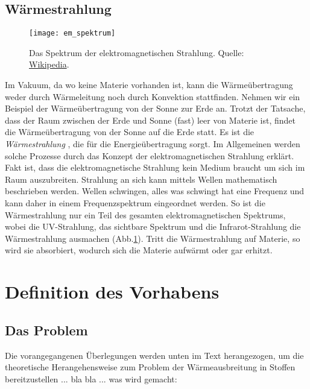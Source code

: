 \subsection{Wärmestrahlung}

\begin{figure}[!h]
	\centering
	\texttt{[image: em\_spektrum]}
	\caption{Das Spektrum der elektromagnetischen Strahlung. Quelle: \href{https://de.wikipedia.org/wiki/Elektromagnetisches_Spektrum}{Wikipedia}.}
	\label{fig:1.1.3_1}
\end{figure}

Im Vakuum, da wo keine Materie vorhanden ist, kann die Wärmeübertragung weder durch Wärmeleitung noch durch Konvektion stattfinden. Nehmen wir ein Beispiel der Wärmeübertragung von der Sonne zur Erde an. Trotzt der Tatsache, dass der Raum zwischen der Erde und Sonne (fast) leer von Materie ist, findet die Wärmeübertragung von der Sonne auf die Erde statt. Es ist die \textit{Wärmestrahlung }, die für die Energieübertragung sorgt. Im Allgemeinen werden solche Prozesse durch das Konzept der elektromagnetischen Strahlung erklärt. Fakt ist, dass die elektromagnetische Strahlung kein Medium braucht um sich im Raum auszubreiten. Strahlung an sich kann mittels Wellen mathematisch beschrieben werden. Wellen schwingen, alles was schwingt hat eine Frequenz und kann daher in einem Frequenzspektrum eingeordnet werden. So ist die Wärmestrahlung nur ein Teil des gesamten elektromagnetischen Spektrums, wobei die UV-Strahlung, das sichtbare Spektrum und die Infrarot-Strahlung die Wärmestrahlung ausmachen (Abb.\ref{fig:1.1.3_1}). Tritt die Wärmestrahlung auf Materie, so wird sie absorbiert, wodurch sich die Materie aufwärmt oder gar erhitzt.

\section{Definition des Vorhabens}

\subsection{Das Problem}

Die vorangegangenen Überlegungen werden unten im Text herangezogen, um die theoretische Herangehensweise zum Problem der Wärmeausbreitung in Stoffen bereitzustellen ... bla bla ... was wird gemacht:

